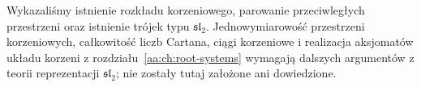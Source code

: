 Wykazaliśmy istnienie rozkładu korzeniowego, parowanie przeciwległych przestrzeni oraz istnienie trójek typu $\mathfrak{sl}_2$. Jednowymiarowość przestrzeni korzeniowych, całkowitość liczb Cartana, ciągi korzeniowe i realizacja aksjomatów układu korzeni z rozdziału~\ref{aa:ch:root-systems} wymagają dalszych argumentów z teorii reprezentacji $\mathfrak{sl}_2$; nie zostały tutaj założone ani dowiedzione.
